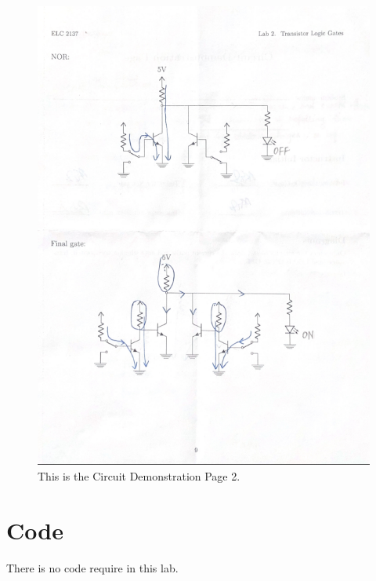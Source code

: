 \documentclass[11pt]{article}
\begin{document}
	\begin{figure}[ht]\centering
		\includegraphics[width=1.0\textwidth]{Lab2Page2}
		\caption{This is the Circuit Demonstration Page 2.}
		\label{fig:original_logo}
	\end{figure}
	
	
	
	\section*{Code}
	
	There is no code require in this lab.\\
	
	
	
\end{document}
